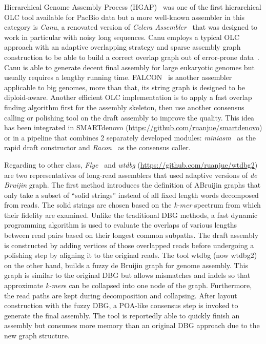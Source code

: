 Hierarchical Genome Assembly Process (HGAP)~\cite{ChinAM2013} was one of the first hierarchical OLC tool available for PacBio data but a more well-known assembler in this category is \emph{Canu}, a renovated version of \emph{Celera Assembler}~\cite{MyersSD2000} that was designed to work in particular with noisy long sequences. Canu employs a typical OLC approach with an adaptive overlapping strategy and sparse assembly graph construction to be able to build a correct overlap graph out of error-prone data~\cite{Koren2017canu}. Canu is able to generate decent final assembly for large eukaryotic genomes but usually requires a lengthy running time.
FALCON~\cite{Chin2016facon} is another assembler applicable to big genomes, more than that, its string graph is designed to be diploid-aware.
Another efficient OLC implementation is to apply a fast overlap finding algorithm first for the assembly skeleton, then use another consensus calling or polishing tool on the draft assembly to improve the quality. This idea has been integrated in SMARTdenovo (\url{https://github.com/ruanjue/smartdenovo}) or in a pipeline that combines 2 separately developed modules: \emph{miniasm}~\cite{Li2016} as the rapid draft constructor and \emph{Racon}~\cite{Vaser2017racon} as the consensus caller. 


Regarding to other class, \emph{Flye}~\cite{Lin2016abruijin,Kolmogorov2019Flye}  and \emph{wtdbg} (\url{https://github.com/ruanjue/wtdbg2}) are two representatives of long-read assemblers that used adaptive versions of \emph{de Bruijin} graph.
The first method introduces the definition of ABruijin graphs that only take a subset of ``solid strings'' instead of all fixed length words decomposed from reads. The solid strings are chosen based on the \emph{k-mer} spectrum from which their fidelity are examined.
Unlike the traditional DBG methods, a fast dynamic programming algorithm is used to evaluate the overlaps of various lengths between read pairs based on their longest common subpaths. The draft assembly is constructed by adding vertices of those overlapped reads before undergoing a polishing step by aligning it to the original reads.
The tool wtdbg (now wtdbg2) on the other hand, builds a fuzzy de Bruijin graph for genome assembly. This graph is similar to the original DBG but allows mismatches and indels so that approximate \emph{k-mer}s can be collapsed into one node of the graph. Furthermore, the read paths are kept during decomposition and collapsing. After layout construction with the fuzzy DBG, a POA-like consensus step is invoked to generate the final assembly. 
The tool is reportedly able to quickly finish an assembly but consumes more memory than an original DBG approach due to the new graph structure. 

